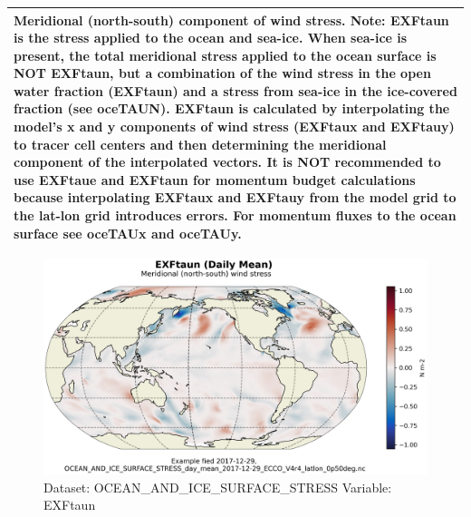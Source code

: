 \begin{longtable}{|m{}|m{}|m{}|m{}|}
\multicolumn{4}{|p{1\textwidth}|}{Meridional (north-south) component of wind stress. Note: EXFtaun is the stress applied to the ocean and sea-ice. When sea-ice is present, the total meridional stress applied to the ocean surface is NOT EXFtaun, but a combination of the wind stress in the open water fraction (EXFtaun) and a stress from sea-ice in the ice-covered fraction (see oceTAUN).  EXFtaun is calculated by interpolating the model's x and y components of wind stress (EXFtaux and EXFtauy) to tracer cell centers and then determining the meridional component of the interpolated vectors. It is NOT recommended to use EXFtaue and EXFtaun for momentum budget calculations because interpolating EXFtaux and EXFtauy from the model grid to the lat-lon grid introduces errors. For momentum fluxes to the ocean surface see oceTAUx and oceTAUy.} \\ \hline
\end{longtable}

\begin{figure}[H]
\centering
\includegraphics[scale=0.55]{../images/plots/latlon_plots/Ocean_and_Sea-Ice_Surface_Stress/EXFtaun.png}
\caption{Dataset: OCEAN\_AND\_ICE\_SURFACE\_STRESS Variable: EXFtaun}
\label{tab:table-OCEAN_AND_ICE_SURFACE_STRESS_EXFtaun-Plot}
\end{figure}
\pagebreak
